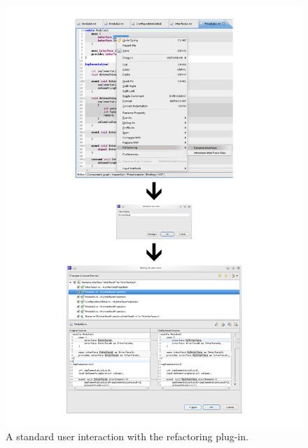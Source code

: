 \documentclass[a4paper,10pt]{report}
\begin{document}
\newpage
\begin{figure}[h]
\centering
\includegraphics[height=0.98\textheight]{userInputSequence.png}
\caption{A standard user interaction with the refactoring plug-in.}
\label{UserInputSequence}
\end{figure}
\end{document}
